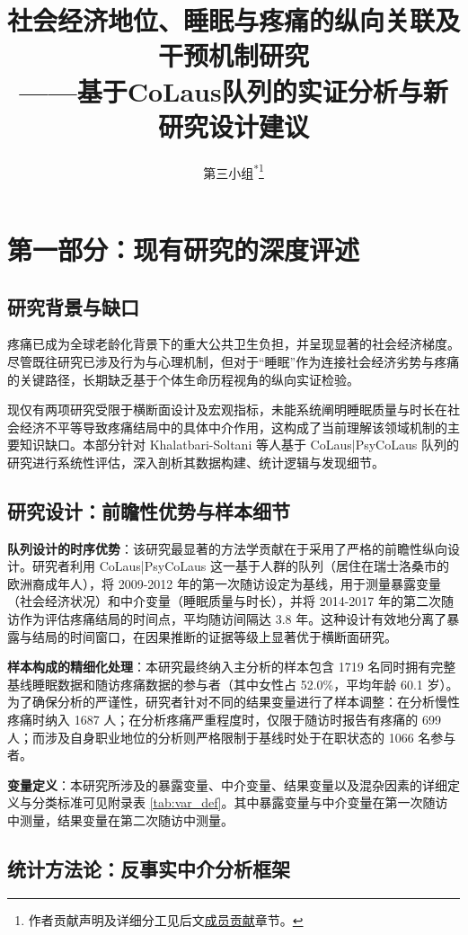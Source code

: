 \documentclass[lang=cn,a4paper,newtx,code=minted,codebg=light]{elegantpaper}
\title{\textbf{社会经济地位、睡眠与疼痛的纵向关联及干预机制研究}\\
\large ——基于CoLaus队列的实证分析与新研究设计建议}
\author{第三小组\textsuperscript{*}{\renewcommand{\thefootnote}{}\footnote{作者贡献声明及详细分工见后文\hyperref[sec:contributions]{成员贡献}章节。}}}
\date{\zhdate{2025/12/20}}
\begin{document}
\maketitle

\section{第一部分：现有研究的深度评述}

\subsection{研究背景与缺口}
疼痛已成为全球老龄化背景下的重大公共卫生负担，并呈现显著的社会经济梯度。尽管既往研究已涉及行为与心理机制，但对于“睡眠”作为连接社会经济劣势与疼痛的关键路径，长期缺乏基于个体生命历程视角的纵向实证检验。

现仅有两项研究受限于横断面设计及宏观指标，未能系统阐明睡眠质量与时长在社会经济不平等导致疼痛结局中的具体中介作用，这构成了当前理解该领域机制的主要知识缺口。本部分针对 Khalatbari-Soltani 等人基于 CoLaus|PsyCoLaus 队列的研究进行系统性评估\cite{khalatbari2025mediating}，深入剖析其数据构建、统计逻辑与发现细节。

\subsection{研究设计：前瞻性优势与样本细节}
\textbf{队列设计的时序优势}：该研究最显著的方法学贡献在于采用了严格的前瞻性纵向设计。研究者利用 CoLaus|PsyCoLaus 这一基于人群的队列（居住在瑞士洛桑市的欧洲裔成年人），将 2009-2012 年的第一次随访设定为基线，用于测量暴露变量（社会经济状况）和中介变量（睡眠质量与时长），并将 2014-2017 年的第二次随访作为评估疼痛结局的时间点，平均随访间隔达 3.8 年。这种设计有效地分离了暴露与结局的时间窗口，在因果推断的证据等级上显著优于横断面研究。

\textbf{样本构成的精细化处理}：本研究最终纳入主分析的样本包含 1719 名同时拥有完整基线睡眠数据和随访疼痛数据的参与者（其中女性占 52.0\%，平均年龄 60.1 岁）。为了确保分析的严谨性，研究者针对不同的结果变量进行了样本调整：在分析慢性疼痛时纳入 1687 人；在分析疼痛严重程度时，仅限于随访时报告有疼痛的 699 人；而涉及自身职业地位的分析则严格限制于基线时处于在职状态的 1066 名参与者。

\textbf{变量定义}：本研究所涉及的暴露变量、中介变量、结果变量以及混杂因素的详细定义与分类标准可见附录表 \ref{tab:var_def}。其中暴露变量与中介变量在第一次随访中测量，结果变量在第二次随访中测量。

\subsection{统计方法论：反事实中介分析框架}
\end{document}
